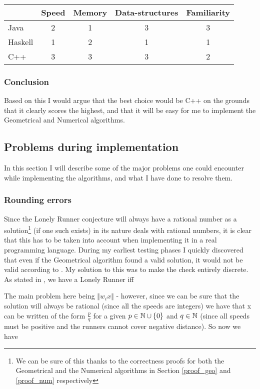 \begin{tabular}{l|c|c|c|c}
        & Speed & Memory & Data-structures & Familiarity \\
\hline
Java    & 2     &  1     &  3              &   3  \\
Haskell & 1     &  2     &  1              &   1  \\
C++     & 3     &  3     &  3              &   2  \\
\end{tabular}

\subsubsection{Conclusion}
Based on this I would argue that the best choice would be C++ on the grounds that it clearly scores the highest, and that it will be easy for me to implement the Geometrical and Numerical algorithms.

\subsection{Problems during implementation}
In this section I will describe some of the major problems one could encounter while implementing the algorithms, and what I have done to resolve them.

\subsubsection{Rounding errors}
Since the Lonely Runner conjecture will always have a rational number as a solution\footnote{We can be sure of this thanks to the correctness proofs for both the Geometrical and the Numerical algorithms in Section \ref{proof_geo} and \ref{proof_num} respectively} (if one such exists) in its nature deals with rational numbers, it is clear that this has to be taken into account when implementing it in a real programming language. During my earliest testing phases I quickly discovered that even if the Geometrical algorithm found a valid solution, it would not be valid according to . My solution to this was to make the check entirely discrete. As stated in , we have a Lonely Runner iff

The main problem here being $\Vert w_i x\Vert$ - however, since we can be sure that the solution will always be rational (since all the speeds are integers) we have that x can be written of the form $\frac{p}{q}$ for a given $p \in \mathbb{N}\cup\{0\}$ and $q \in \mathbb{N}$ (since all speeds must be positive and the runners cannot cover negative distance). So now we have

